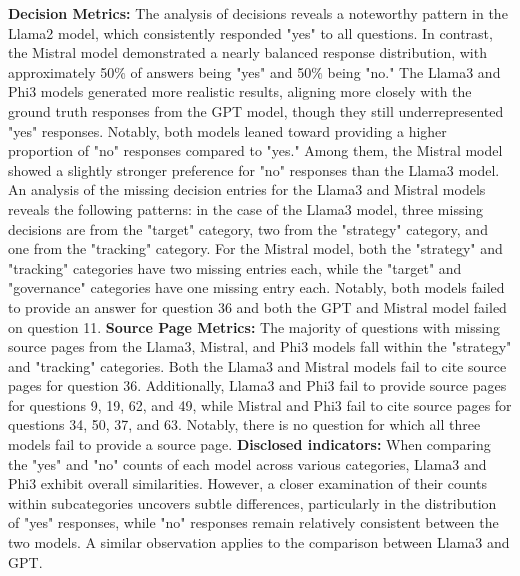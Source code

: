 \documentclass[]{article}
\begin{document}
\textbf{Decision Metrics:} The analysis of decisions reveals a noteworthy pattern in the Llama2 model, 
which consistently responded "yes" to all questions. 
In contrast, the Mistral model demonstrated a nearly balanced response distribution, 
with approximately 50$\%$ of answers being "yes" and 50$\%$ being "no." 
The Llama3 and Phi3 models generated more realistic results, 
aligning more closely with the ground truth responses from the GPT model, 
though they still underrepresented "yes" responses. 
Notably, both models leaned toward providing a higher proportion of "no" responses compared to "yes." 
Among them, the Mistral model showed a slightly stronger preference for "no" responses than the Llama3 model.
\newline\newline
An analysis of the missing decision entries for the Llama3 and Mistral models reveals the following patterns: 
in the case of the Llama3 model, three missing decisions are from the "target" category, 
two from the "strategy" category, and one from the "tracking" category. \newline
For the Mistral model, both the "strategy" and "tracking" categories have two missing entries each,
while the "target" and "governance" categories have one missing entry each. Notably, 
both models failed to provide an answer for question 36 and both the GPT and Mistral model failed on question 11.
\newline\newline
\textbf{Source Page Metrics:} The majority of questions with missing source pages from the Llama3, Mistral, and Phi3 models 
fall within the "strategy" and "tracking" categories. 
Both the Llama3 and Mistral models fail to cite source pages for question 36. 
Additionally, Llama3 and Phi3 fail to provide source pages for questions 9, 19, 62, and 49, 
while Mistral and Phi3 fail to cite source pages for questions 34, 50, 37, and 63. Notably, 
there is no question for which all three models fail to provide a source page.
\newline\newline
\textbf{Disclosed indicators:} 
When comparing the "yes" and "no" counts of each model across various categories, 
Llama3 and Phi3 exhibit overall similarities. However, 
a closer examination of their counts within subcategories uncovers subtle differences, 
particularly in the distribution of "yes" responses, while "no" responses remain relatively 
consistent between the two models. A similar observation applies to the comparison between Llama3 and GPT.
\newline\newline
\end{document}
